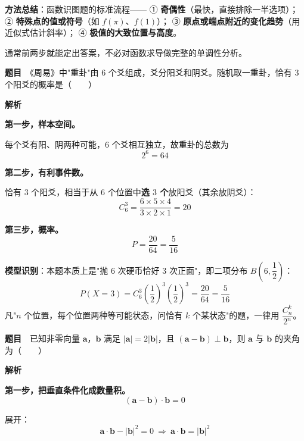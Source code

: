 \begin{gktip}
\textbf{方法总结}：函数识图题的标准流程——
① \textbf{奇偶性}（最快，直接排除一半选项）；
② \textbf{特殊点的值或符号}（如 $f(\pi)$、$f(1)$）；
③ \textbf{原点或端点附近的变化趋势}（用近似式估计斜率）；
④ \textbf{极值的大致位置与高度}。

通常前两步就能定出答案，不必对函数求导做完整的单调性分析。
\end{gktip}

\par\medskip


\textbf{题目}　《周易》中"重卦"由 $6$ 个爻组成，爻分阳爻和阴爻。随机取一重卦，恰有 $3$ 个阳爻的概率是（　　）

\textbf{解析}

\textbf{第一步，样本空间。}

每个爻有阳、阴两种可能，$6$ 个爻相互独立，故重卦的总数为
\[2^{6}=64\]

\textbf{第二步，有利事件数。}

恰有 $3$ 个阳爻，相当于从 $6$ 个位置中\textbf{选 $3$ 个}放阳爻（其余放阴爻）：
\[C_6^{3}=\frac{6\times5\times4}{3\times2\times1}=20\]

\textbf{第三步，概率。}
\[P=\frac{20}{64}=\frac5{16}\]


\begin{gktip}
\textbf{模型识别}：本题本质上是"抛 $6$ 次硬币恰好 $3$ 次正面"，即二项分布 $B\left(6,\dfrac12\right)$：
\[P(X=3)=C_6^{3}\left(\frac12\right)^{3}\left(\frac12\right)^{3}=\frac{20}{64}=\frac5{16}\]
凡"$n$ 个位置，每个位置两种等可能状态，问恰有 $k$ 个某状态"的题，一律用 $\dfrac{C_n^{k}}{2^{n}}$。
\end{gktip}

\par\medskip


\textbf{题目}　已知非零向量 $\boldsymbol a$，$\boldsymbol b$ 满足 $|\boldsymbol a|=2|\boldsymbol b|$，且 $(\boldsymbol a-\boldsymbol b)\perp\boldsymbol b$，则 $\boldsymbol a$ 与 $\boldsymbol b$ 的夹角为（　　）

\textbf{解析}

\textbf{第一步，把垂直条件化成数量积。}
\[(\boldsymbol a-\boldsymbol b)\cdot\boldsymbol b=0\]

展开：
\[\boldsymbol a\cdot\boldsymbol b-|\boldsymbol b|^{2}=0\ \Longrightarrow\ \boldsymbol a\cdot\boldsymbol b=|\boldsymbol b|^{2}\]

